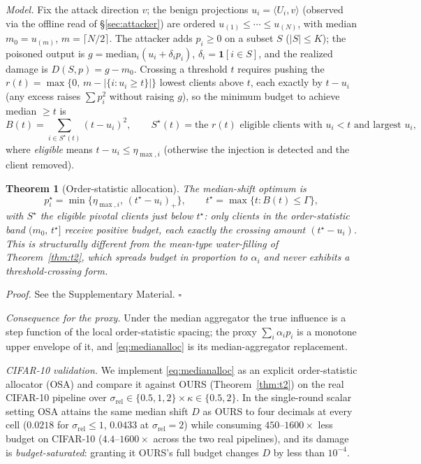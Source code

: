 \documentclass[final,1p,times]{elsarticle}
\newtheorem{theorem}{Theorem}
\begin{document}
\emph{Model.} Fix the attack direction $v$; the benign projections
$u_i=\langle U_i,v\rangle$ (observed via the offline read of
\S\ref{sec:attacker}) are ordered $u_{(1)}\le\cdots\le u_{(N)}$, with
median $m_0=u_{(m)}$, $m{=}\lceil N/2\rceil$. The attacker adds
$p_i\ge0$ on a subset $S$ ($|S|\le K$); the poisoned output is
$g=\mathrm{median}_i(u_i+\delta_i p_i)$, $\delta_i=\mathbf{1}[i\in
S]$, and the realized damage is $D(S,p)=g-m_0$. Crossing a threshold
$t$ requires pushing the $r(t){=}\max\{0,\,m{-}|\{i:u_i\ge t\}|\}$
lowest clients above $t$, each exactly by $t-u_i$ (any excess raises
$\sum p_i^2$ without raising $g$), so the minimum budget to achieve
median $\ge t$ is
\begin{equation}
B(t)=\sum_{i\in S^\star(t)}(t-u_i)^2,\qquad
S^\star(t)=\text{the }r(t)\text{ eligible clients with }u_i<t
\text{ and largest }u_i,
\label{eq:crosscost}
\end{equation}
where \emph{eligible} means $t-u_i\le\eta_{\max,i}$ (otherwise the
injection is detected and the client removed).

\begin{theorem}[Order-statistic allocation]\label{thm:t2median}
The median-shift optimum is
\begin{equation}
p_i^\star=\min\{\eta_{\max,i},\,(t^\star-u_i)_+\},\qquad
t^\star=\max\{t: B(t)\le\Gamma\},
\label{eq:medianalloc}
\end{equation}
with $S^\star$ the eligible pivotal clients just below $t^\star$: only
clients in the order-statistic band $(m_0,\,t^\star]$ receive positive
budget, each exactly the crossing amount $(t^\star-u_i)$. This is
structurally different from the mean-type water-filling of
Theorem~\ref{thm:t2}, which spreads budget in proportion to $\alpha_i$
and never exhibits a threshold-crossing form.
\end{theorem}
\emph{Proof.} See the Supplementary Material. \hfill$\square$

\emph{Consequence for the proxy.} Under the median aggregator the true
influence is a step function of the local order-statistic spacing; the
proxy $\sum_i\alpha_i p_i$ is a monotone upper envelope of it, and
\eqref{eq:medianalloc} is its median-aggregator replacement.

\emph{CIFAR-10 validation.} We implement \eqref{eq:medianalloc} as an
explicit order-statistic allocator (OSA) and compare it against OURS
(Theorem~\ref{thm:t2}) on the real CIFAR-10 pipeline over
$\sigma_{\mathrm{rel}}{\in}\{0.5,1,2\}\times\kappa{\in}\{0.5,2\}$.
In the single-round scalar setting OSA attains the same median shift
$D$ as OURS to four decimals at every cell ($0.0218$ for
$\sigma_{\mathrm{rel}}\le1$, $0.0433$ at $\sigma_{\mathrm{rel}}{=}2$)
while consuming $450$--$1600\times$ less budget on CIFAR-10
($4.4$--$1600\times$ across the two real pipelines), and its damage is
\emph{budget-saturated}: granting it OURS's full budget changes $D$ by
less than $10^{-4}$.
\end{document}
